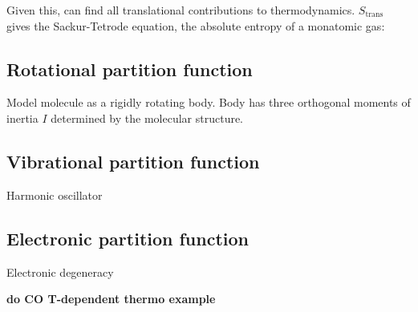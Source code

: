 \documentclass[11pt]{article}
\begin{document}
Given this, can find all translational contributions to thermodynamics.
$S_\mathrm{trans}$ gives the Sackur-Tetrode equation, the absolute entropy of a
monatomic gas:


\subsection{Rotational partition function}
Model molecule as a rigidly rotating body.  Body has three orthogonal moments
of inertia $I$ determined by the molecular structure.

\subsection{Vibrational partition function}
Harmonic oscillator

\subsection{Electronic partition function}
Electronic degeneracy


{\bf do CO T-dependent thermo example}
\end{document}
